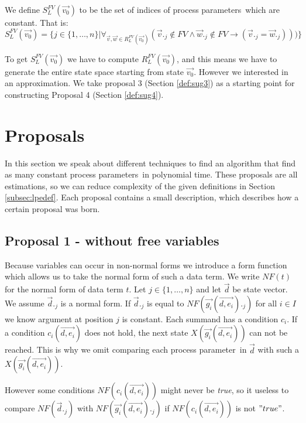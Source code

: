 \index{}\documentclass[a4paper,10pt]{article}
\theoremstyle{plain}
\theoremstyle{definition}
\newcommand{\ovr}{\overrightarrow}
\newcommand{\pp}{process parameter}
\newcommand{\pps}{process parameters}
\newcommand{\ti}{\textit}
\begin{document}
\begin{defn}\label{def:lpe_comp_fv} We define $S_L^{FV}(\ovr{v_0})$ to be the set of indices of \pps\ which are constant. That is:\\

$S_L^{FV}(\ovr{v_0}) = \lbrace j \in  \lbrace 1, \ldots, n \rbrace \vert \forall_{\ovr{v}, \ovr{w} \in R_L^{FV}(\ovr{v_0})}( \ovr{v}._j \not\in FV \wedge \ovr{w}._j \not\in FV \rightarrow ( \ovr{v}._j = \ovr{w}._j)))
\rbrace $
\end{defn}

To get $S_L^{FV} (\ovr{v_0})$ we have to compute $R_L^{FV}(\ovr{v_0})$, and this means we have to generate the entire state space starting from state $\ovr{v_0}$. However we interested in an approximation. We take proposal 3 (Section \ref{def:sug3}) as a starting point for constructing Proposal 4 (Section \ref{def:sug4}).

\section{Proposals}
In this section we speak about different techniques to find an algorithm that find as many constant \pps\ in polynomial time. These proposals are all estimations, so we can reduce complexity of the given definitions in Section \ref{subsec:lpedef}. Each proposal contains a small description, which describes how a certain proposal was born. 

\subsection{Proposal 1 - without free variables} \label{sec:prop1}
Because variables can occur in non-normal forms we introduce a form function which allows us to take the normal form of such a data term. 
We write $NF(t)$ for the normal form of data term $t$. 
Let $j \in \lbrace 1, \ldots,  n \rbrace $ and let $\ovr{d}$ be state vector. We assume $\ovr{d}._j$ is a normal form. If $\ovr{d}._j$ is equal to $NF(\ovr{g_i}(\ovr{d,e_i})._j)$ for all $i \in I$ we know argument at position $j$ is constant. Each summand has a condition $c_i$. If a condition $c_i(\ovr{d, e_i})$ does not hold, the next state $X(\ovr{g_i}(\ovr{d, e_i}))$ can not be reached. This is why we omit comparing each \pp\ in $\ovr{d} $ with such a $X(\ovr{g_i}(\ovr{d, e_i}))$.

 However some conditions $NF(c_i(\ovr{d,e_i}))$ might never be \ti{true}, so it useless to compare $NF(\ovr{d}._j)$ with $NF(\ovr{g_i}(\ovr{d,e_i})._j)$  if $NF(c_i(\ovr{d,e_i}))$ is not  $"true"$. \\
\end{document}
